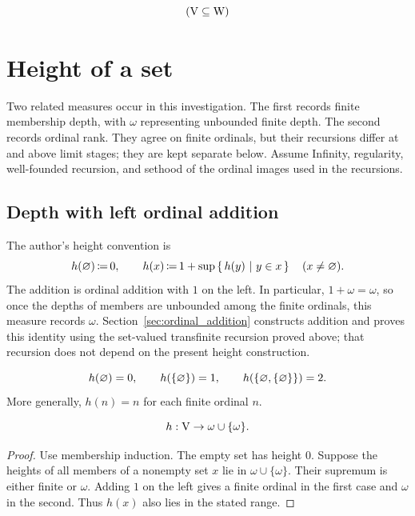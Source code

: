 \begin{axiom}
\[
(\mathrm{V}\subseteq \mathrm{W})
\]
\end{axiom}
\section{Height of a set}
Two related measures occur in this investigation. The first records finite
membership depth, with $\omega$ representing unbounded finite depth. The
second records ordinal rank. They agree on finite ordinals, but their
recursions differ at and above limit stages; they are kept separate below.
Assume Infinity, regularity, well-founded recursion, and sethood of the ordinal images
used in the recursions.

\subsection{Depth with left ordinal addition}
\begin{definition}[height]
\label{height}
The author's height convention is
\[
h(\varnothing)\,{\coloneqq}\, 0,\qquad
h(x)\,{\coloneqq}\, 1+\sup\left\{\,h(y)\ \middle|\ y\in x\,\right\}\quad(x\ne\varnothing).
\]
The addition is ordinal addition with $1$ on the left. In particular,
$1+\omega=\omega$, so once the depths of members are unbounded among the
finite ordinals, this measure records $\omega$.
Section~\ref{sec:ordinal_addition} constructs addition and proves this
identity using the set-valued transfinite recursion proved above; that
recursion does not depend on the present height construction.
\end{definition}

\begin{example*}
\[
h(\varnothing)=0,\qquad
h(\{\varnothing\})=1,\qquad
h(\{\varnothing,\{\varnothing\}\})=2.
\]
More generally, $h(n)=n$ for each finite ordinal $n$.
\end{example*}

\begin{lemma}
\[
h:\mathrm{V}\to\omega\cup\{\omega\}.
\label{lem:depthinon}
\]
\end{lemma}
\begin{proof}
Use membership induction. The empty set has height $0$. Suppose the
heights of all members of a nonempty set $x$ lie in
$\omega\cup\{\omega\}$. Their supremum is either finite or $\omega$.
Adding $1$ on the left gives a finite ordinal in the first case and
$\omega$ in the second. Thus $h(x)$ also lies in the stated range.
\end{proof}


